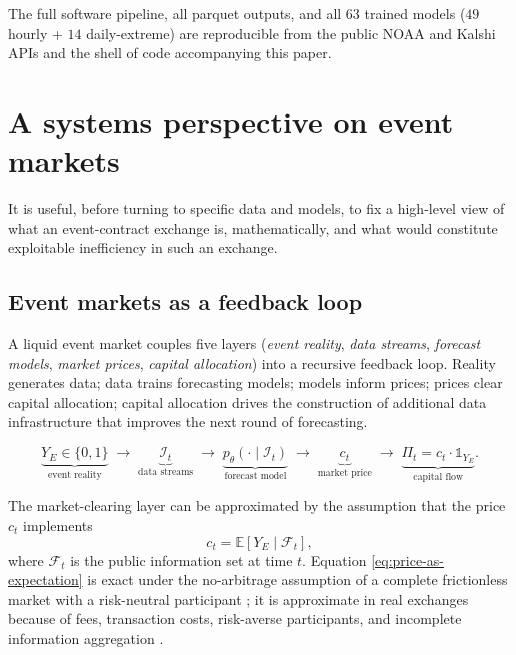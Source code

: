 \documentclass[11pt]{article}
\begin{document}
The full software pipeline, all parquet outputs, and all $63$ trained models
($49$ hourly + $14$ daily-extreme) are reproducible from the public NOAA
and Kalshi APIs and the shell of code accompanying this paper.

\section{A systems perspective on event markets}
\label{sec:systems}

It is useful, before turning to specific data and models, to fix a
high-level view of what an event-contract exchange is, mathematically,
and what would constitute exploitable inefficiency in such an exchange.

\subsection{Event markets as a feedback loop}

A liquid event market couples five layers (\emph{event reality}, \emph{data
streams}, \emph{forecast models}, \emph{market prices}, \emph{capital
allocation}) into a recursive feedback loop. Reality generates data; data
trains forecasting models; models inform prices; prices clear capital
allocation; capital allocation drives the construction of additional data
infrastructure that improves the next round of forecasting.

\[
\underbrace{Y_E \in \{0, 1\}}_{\text{event reality}} \;\longrightarrow\;
\underbrace{\mathcal{I}_t}_{\text{data streams}} \;\longrightarrow\;
\underbrace{p_\theta(\cdot \mid \mathcal{I}_t)}_{\text{forecast model}} \;\longrightarrow\;
\underbrace{c_t}_{\text{market price}} \;\longrightarrow\;
\underbrace{\Pi_t = c_t \cdot \mathbb{1}_{Y_E}}_{\text{capital flow}}.
\]

The market-clearing layer can be approximated by the assumption that the
price $c_t$ implements
\begin{equation}
c_t = \mathbb{E}[Y_E \mid \mathcal{F}_t],
\label{eq:price-as-expectation}
\end{equation}
where $\mathcal{F}_t$ is the public information set at time $t$. Equation
\eqref{eq:price-as-expectation} is exact under the no-arbitrage assumption
of a complete frictionless market with a risk-neutral participant
\citep{wolfers2004prediction}; it is approximate in real exchanges because
of fees, transaction costs, risk-averse participants, and incomplete
information aggregation \citep{manski2006interpreting}.
\end{document}
